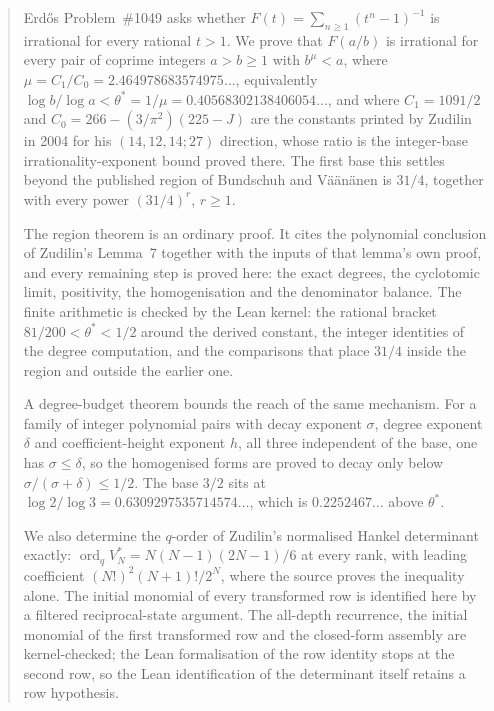 \maketitle
\noteprovenance

\begin{abstract}
\noindent
Erd\H{o}s Problem~\#1049 asks whether
\(F(t)=\sum_{n\ge1}(t^n-1)^{-1}\) is irrational for every rational \(t>1\).
We prove that \(F(a/b)\) is irrational for every pair of coprime integers
\(a>b\ge1\) with \(b^{\mu}<a\), where \(\mu=C_1/C_0=2.464978683574975\ldots\),
equivalently \(\log b/\log a<\theta^{*}=1/\mu=0.40568302138406054\ldots\), and
where \(C_1=1091/2\) and \(C_0=266-(3/\pi^{2})(225-J)\) are the constants
printed by Zudilin in 2004 for his \((14,12,14;27)\) direction, whose ratio is
the integer-base irrationality-exponent bound proved there.  The first base this settles beyond the
published region of Bundschuh and V\"a\"an\"anen is \(31/4\), together with
every power \((31/4)^{r}\), \(r\ge1\).

The region theorem is an ordinary proof.  It cites the polynomial conclusion of
Zudilin's Lemma~7 together with the inputs of that lemma's own proof, and every
remaining step is proved here: the exact degrees, the cyclotomic limit,
positivity, the homogenisation and the denominator balance.  The finite
arithmetic is checked by the Lean kernel: the rational bracket
\(81/200<\theta^{*}<1/2\) around the derived constant, the integer identities of
the degree computation, and the comparisons that place \(31/4\) inside the
region and outside the earlier one.

A degree-budget theorem bounds the reach of the same mechanism.  For a family
of integer polynomial pairs with decay exponent \(\sigma\), degree exponent
\(\delta\) and coefficient-height exponent \(h\), all three independent of the
base, one has \(\sigma\le\delta\), so the homogenised forms are proved to decay
only below \(\sigma/(\sigma+\delta)\le1/2\).  The base \(3/2\) sits at
\(\log2/\log3=0.6309297535714574\ldots\), which is \(0.2252467\ldots\) above
\(\theta^{*}\).

We also determine the \(q\)-order of Zudilin's normalised Hankel determinant
exactly: \(\operatorname{ord}_qV_N^{*}=N(N-1)(2N-1)/6\) at every rank, with
leading coefficient \((N!)^{2}(N+1)!/2^{N}\), where the source proves the
inequality alone.  The initial monomial of every transformed row is identified
here by a filtered reciprocal-state argument.  The all-depth recurrence, the
initial monomial of the first transformed row and the closed-form assembly are
kernel-checked; the Lean formalisation of the row identity stops at the second
row, so the Lean identification of the determinant itself retains a row
hypothesis.


\end{abstract}
